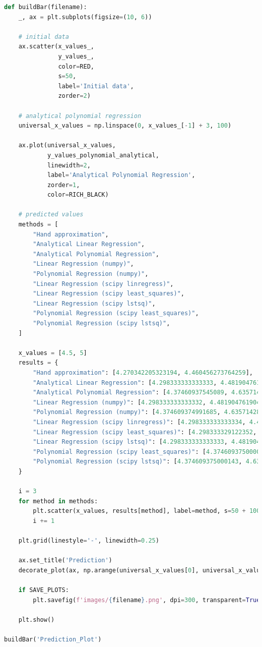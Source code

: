 \documentclass[a4paper, 14pt]{extarticle}
\begin{document}
\begin{center}
    \begin{lstlisting}[language=Python]
def buildBar(filename):
    _, ax = plt.subplots(figsize=(10, 6))

    # initial data
    ax.scatter(x_values_,
               y_values_,
               color=RED,
               s=50,
               label='Initial data',
               zorder=2)

    # analytical polynomial regression
    universal_x_values = np.linspace(0, x_values_[-1] + 3, 100)

    ax.plot(universal_x_values,
            y_values_polynomial_analytical,
            linewidth=2,
            label='Analytical Polynomial Regression',
            zorder=1,
            color=RICH_BLACK)

    # predicted values
    methods = [
        "Hand approximation",
        "Analytical Linear Regression",
        "Analytical Polynomial Regression",
        "Linear Regression (numpy)",
        "Polynomial Regression (numpy)",
        "Linear Regression (scipy linregress)",
        "Linear Regression (scipy least_squares)",
        "Linear Regression (scipy lstsq)",
        "Polynomial Regression (scipy least_squares)",
        "Polynomial Regression (scipy lstsq)",
    ]

    x_values = [4.5, 5]
    results = {
        "Hand approximation": [4.270342205323194, 4.460456273764259],
        "Analytical Linear Regression": [4.298333333333333, 4.481904761904762],
        "Analytical Polynomial Regression": [4.37460937545089, 4.63571428619550],
        "Linear Regression (numpy)": [4.298333333333332, 4.481904761904761],
        "Polynomial Regression (numpy)": [4.374609374991685, 4.635714285706156],
        "Linear Regression (scipy linregress)": [4.298333333333334, 4.481904761904762],
        "Linear Regression (scipy least_squares)": [4.298333329122352, 4.481904758018923],
        "Linear Regression (scipy lstsq)": [4.298333333333333, 4.481904761904762],
        "Polynomial Regression (scipy least_squares)": [4.374609375000068, 4.635714285714329],
        "Polynomial Regression (scipy lstsq)": [4.374609375000143, 4.6357142857144185],
    }

    i = 3
    for method in methods:
        plt.scatter(x_values, results[method], label=method, s=50 + 100 * (i-2), zorder=12-i)
        i += 1

    plt.grid(linestyle='-', linewidth=0.25)

    ax.set_title('Prediction')
    decorate_plot(ax, np.arange(universal_x_values[0], universal_x_values[-1]+1, 1), 'x', 'y', loc=(0.55, 0.1))

    if SAVE_PLOTS:
        plt.savefig(f'images/{filename}.png', dpi=300, transparent=True)

    plt.show()

buildBar('Prediction_Plot')
    \end{lstlisting}
\end{center}
\end{document}
